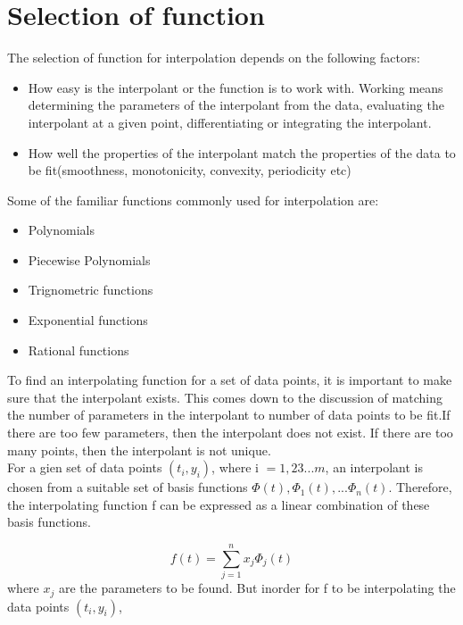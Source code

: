 \documentclass[12pt]{article}
\begin{document}
\section{Selection of function}
The selection of function for interpolation depends on the following factors:
\begin{itemize}
	\item How easy is the interpolant or the function is to work with. Working means determining the parameters of the interpolant from the data, evaluating the interpolant at a given point, differentiating or integrating the interpolant.
	\item How well the properties of the interpolant match the properties of the data to be fit(smoothness, monotonicity, convexity, periodicity etc)
\end{itemize}

Some of the familiar functions commonly used for interpolation are:
\begin{itemize}
	\item Polynomials
	\item Piecewise Polynomials
	\item Trignometric functions
	\item Exponential functions
	\item Rational functions
\end{itemize}

To find an interpolating function for a set of data points, it is important to make sure that the interpolant exists. This comes down to the discussion of matching the number of parameters in the interpolant to number of data points to be fit.If there are too few parameters, then the interpolant does not exist. If there are too many points, then the interpolant is not unique. \\

For a gien set of data points $(t_i,y_i)$, where i $= 1,2 3...m$, an interpolant is chosen from a suitable set of basis functions $\Phi(t), \Phi_1(t), ... \Phi_n(t)$. Therefore, the interpolating function f can be expressed as a linear combination of these basis functions.


\begin{equation*}
f(t) = \sum_{j=1}^{n}x_j \Phi_j (t) 
\end{equation*}
where $x_j$ are the parameters to be found. But inorder for f to be interpolating the data points $(t_i,y_i)$, 
\end{document}
